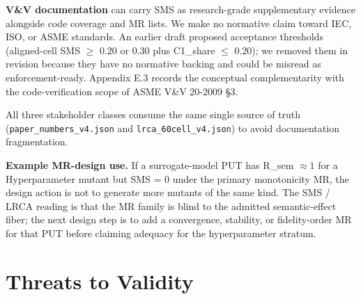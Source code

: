 \documentclass[12pt]{article}
\begin{document}
\textbf{V\&V documentation} can carry SMS as research-grade
supplementary evidence alongside code coverage and MR lists. We make no
normative claim toward IEC, ISO, or ASME standards. An earlier draft
proposed acceptance thresholds (aligned-cell SMS $\geq$ 0.20 or 0.30 plus
C1\_share $\leq$ 0.20); we removed them in revision because they have no
normative backing and could be misread as enforcement-ready. Appendix
E.3 records the conceptual complementarity with the code-verification
scope of ASME V\&V 20-2009 §3.

All three stakeholder classes consume the same single source of truth
(\texttt{paper\_numbers\_v4.json} and \texttt{lrca\_60cell\_v4.json}) to
avoid documentation fragmentation.

\textbf{Example MR-design use.} If a surrogate-model PUT has
R\_sem $\approx 1$ for a Hyperparameter mutant but SMS = 0 under the
primary monotonicity MR, the design action is not to generate more
mutants of the same kind. The SMS / LRCA reading is that the MR family is
blind to the admitted semantic-effect fiber; the next design step is to
add a convergence, stability, or fidelity-order MR for that PUT before
claiming adequacy for the hyperparameter stratum.


\section{Threats to Validity}\label{threats-to-validity}
\end{document}
